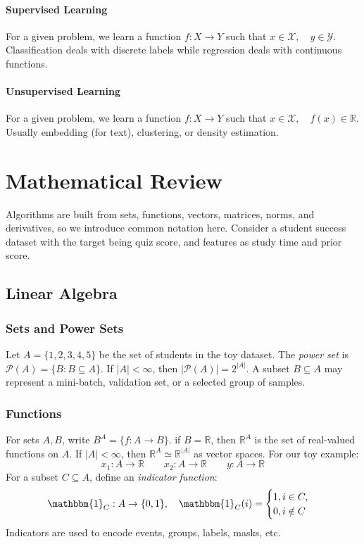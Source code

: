 \documentclass[12pt,oneside]{book}
\numberwithin{equation}{section}
\theoremstyle{definition}
\theoremstyle{plain}
\theoremstyle{remark}
\newcommand{\R}{\mathbb{R}}
\newcommand{\powerset}{\mathcal{P}}
\begin{document}
\paragraph{Supervised Learning}
For a given problem, we learn a function $f: X \rightarrow Y$ such that $x \in \mathcal{X}, \quad y \in \mathcal{Y}$. Classification deals with discrete labels while regression deals with continuous functions.

\paragraph{Unsupervised Learning}
For a given problem, we learn a function $f: X \rightarrow Y$ such that $x \in \mathcal{X}, \quad f(x) \in \R$. Usually embedding (for text), clustering, or density estimation.

\section{Mathematical Review}
Algorithms are built from sets, functions, vectors, matrices, norms, and derivatives, so we introduce common notation here. Consider a student success dataset with the target being quiz score, and features as study time and prior score.

\subsection{Linear Algebra}

\subsubsection{Sets and Power Sets}
Let $A = \{1,2,3,4,5\}$ be the set of students in the toy dataset. The \emph{power set} is $\powerset(A)=\{B: B \subseteq A\}$. If $|A|<\infty$, then $|\powerset(A)|=2^{|A|}$. A subset $B \subseteq A$ may represent a mini-batch, validation set, or a selected group of samples.

\subsubsection{Functions}
For sets $A,B$, write $B^A=\{f: A\rightarrow B\}$. if $B=\R$, then $\R^A$ is the set of real-valued functions on $A$. If $|A| < \infty$, then $\R^A \simeq \R^{|A|}$ as vector spaces. For our toy example: \[x_1: A \rightarrow \R \qquad x_2: A \rightarrow \R \qquad y: A \rightarrow \R\]
For a subset $C \subseteq A$, define an \emph{indicator function}:
\[
\mathbbm{1}_C: A \rightarrow \{0,1\}, \quad \mathbbm{1}_C(i)=
\begin{cases}
    1, i \in C, \\
    0, i \notin C
\end{cases}
\]
Indicators are used to encode events, groups, labels, masks, etc.
\end{document}

